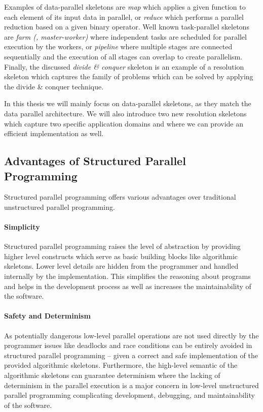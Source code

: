 Examples of data-parallel skeletons are \emph{map} which applies a given function to each element of its input data in parallel, or \emph{reduce} which performs a parallel reduction based on a given binary operator.
Well known task-parallel skeletons are \emph{farm (\aka, master-worker)} where independent tasks are scheduled for parallel execution by the workers, or \emph{pipeline} where multiple stages are connected sequentially and the execution of all stages can overlap to create parallelism.
Finally, the discussed \emph{divide \& conquer} skeleton is an example of a resolution skeleton which captures the family of problems which can be solved by applying the divide \& conquer technique.

In this thesis we will mainly focus on data-parallel skeletons, as they match the data parallel \GPU architecture.
We will also introduce two new resolution skeletons which capture two specific application domains and where we can provide an efficient \GPU implementation as well.

\subsection{Advantages of Structured Parallel Programming}
Structured parallel programming offers various advantages over traditional unstructured parallel programming.

\paragraph{Simplicity}
Structured parallel programming raises the level of abstraction by providing higher level constructs which serve as basic building blocks like algorithmic skeletons.
Lower level details are hidden from the programmer and handled internally by the implementation.
This simplifies the reasoning about programs and helps in the development process as well as increases the maintainability of the software.

\paragraph{Safety and Determinism}
As potentially dangerous low-level parallel operations are not used directly by the programmer issues like deadlocks and race conditions can be entirely avoided in structured parallel programming -- given a correct and safe implementation of the provided algorithmic skeletons.
Furthermore, the high-level semantic of the algorithmic skeletons can guarantee determinism where the lacking of determinism in the parallel execution is a major concern in low-level unstructured parallel programming complicating development, debugging, and maintainability of the software.

